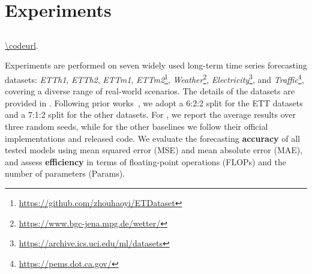 \section{Experiments}
\label{sec:exp}


\subsection{}
\label{sec:exp_main}

 \url{\codeurl}.

Experiments are performed on seven widely used long-term time series forecasting datasets: 
\textit{ETTh1}, 
\textit{ETTh2}, 
\textit{ETTm1}, 
\textit{ETTm2}\footnote{\url{https://github.com/zhouhaoyi/ETDataset}}, 
\textit{Weather}\footnote{\url{https://www.bgc-jena.mpg.de/wetter/}}, 
\textit{Electricity}\footnote{\url{https://archive.ics.uci.edu/ml/datasets}}, 
and \textit{Traffic}\footnote{\url{https://pems.dot.ca.gov/}}, 
covering a diverse range of real-world scenarios.
The details of the datasets are provided in .
Following prior works~\citep{nie2023patchtst, zhang2023crossformer, huang2025timebase}, we adopt a 6:2:2 split for the ETT datasets and a 7:1:2 split for the other datasets. 
For \blue{\sysplus}, we report the average results over three random seeds, while for the other baselines we follow their official implementations and released code. 
We evaluate the forecasting \textbf{accuracy} of all tested models using mean squared error (MSE) and mean absolute error (MAE), 
and assess \textbf{efficiency} in terms of floating-point operations (FLOPs) and the number of parameters (Params).

